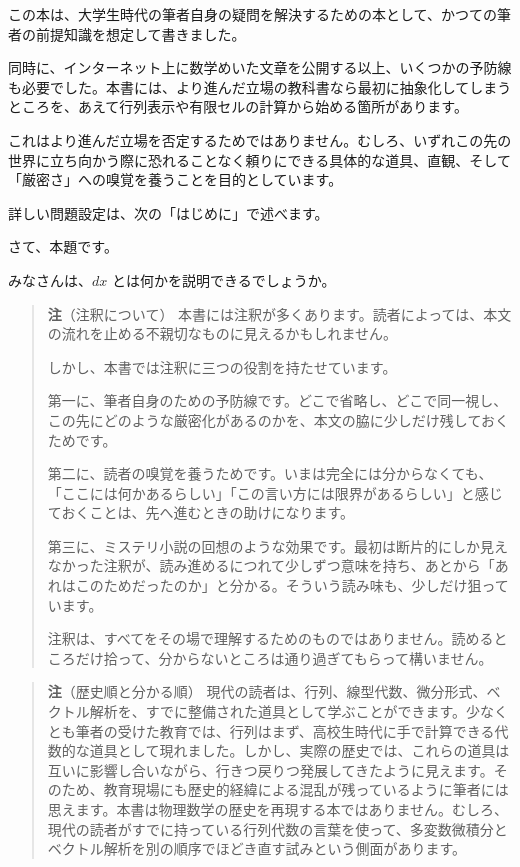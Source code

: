 \documentclass[a4paper,12pt,openany]{book}
\begin{document}
この本は、大学生時代の筆者自身の疑問を解決するための本として、かつての筆者の前提知識を想定して書きました。

同時に、インターネット上に数学めいた文章を公開する以上、いくつかの予防線も必要でした。本書には、より進んだ立場の教科書なら最初に抽象化してしまうところを、あえて行列表示や有限セルの計算から始める箇所があります。

これはより進んだ立場を否定するためではありません。むしろ、いずれこの先の世界に立ち向かう際に恐れることなく頼りにできる具体的な道具、直観、そして「厳密さ」への嗅覚を養うことを目的としています。

詳しい問題設定は、次の「はじめに」で述べます。

さて、本題です。

みなさんは、\(dx\) とは何かを説明できるでしょうか。

\begin{quote}
\textbf{注}（注釈について）
本書には注釈が多くあります。読者によっては、本文の流れを止める不親切なものに見えるかもしれません。

しかし、本書では注釈に三つの役割を持たせています。

第一に、筆者自身のための予防線です。どこで省略し、どこで同一視し、この先にどのような厳密化があるのかを、本文の脇に少しだけ残しておくためです。

第二に、読者の嗅覚を養うためです。いまは完全には分からなくても、「ここには何かあるらしい」「この言い方には限界があるらしい」と感じておくことは、先へ進むときの助けになります。

第三に、ミステリ小説の回想のような効果です。最初は断片的にしか見えなかった注釈が、読み進めるにつれて少しずつ意味を持ち、あとから「あれはこのためだったのか」と分かる。そういう読み味も、少しだけ狙っています。

注釈は、すべてをその場で理解するためのものではありません。読めるところだけ拾って、分からないところは通り過ぎてもらって構いません。
\end{quote}

\begin{quote}
\textbf{注}（歴史順と分かる順）
現代の読者は、行列、線型代数、微分形式、ベクトル解析を、すでに整備された道具として学ぶことができます。少なくとも筆者の受けた教育では、行列はまず、高校生時代に手で計算できる代数的な道具として現れました。しかし、実際の歴史では、これらの道具は互いに影響し合いながら、行きつ戻りつ発展してきたように見えます。そのため、教育現場にも歴史的経緯による混乱が残っているように筆者には思えます。本書は物理数学の歴史を再現する本ではありません。むしろ、現代の読者がすでに持っている行列代数の言葉を使って、多変数微積分とベクトル解析を別の順序でほどき直す試みという側面があります。
\end{quote}
\end{document}
